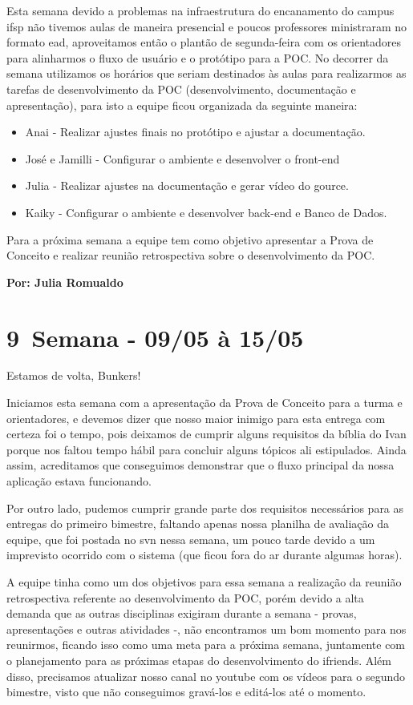 Esta semana devido a problemas na infraestrutura do encanamento do campus \acs{ifsp} não tivemos aulas de maneira presencial e poucos professores ministraram no formato \acs{ead}, aproveitamos então o plantão de segunda-feira com os orientadores para alinharmos o fluxo de usuário e o protótipo para a \acs{POC}. No decorrer da semana utilizamos os horários que seriam destinados às aulas para realizarmos as tarefas de desenvolvimento da \acs{POC} (desenvolvimento, documentação e apresentação), para isto a equipe ficou organizada da seguinte maneira: 
\begin{itemize}
    \item Anai - Realizar ajustes finais no protótipo e ajustar a documentação.
    \item José e Jamilli - Configurar o ambiente e desenvolver o \gls{front-end}
    \item Julia - Realizar ajustes na documentação e gerar vídeo do \gls{gource}.
    \item Kaiky - Configurar o ambiente e desenvolver \gls{back-end} e Banco de Dados.
\end{itemize}
\noindent Para a próxima semana a equipe tem como objetivo apresentar a Prova de Conceito e realizar reunião retrospectiva sobre o desenvolvimento da \gls{POC}.

\textbf{Por: Julia Romualdo}

\section{9\textordfeminine \, Semana - 09/05 à 15/05}
Estamos de volta, Bunkers!

Iniciamos esta semana com a apresentação da Prova de Conceito para a turma e orientadores, e devemos dizer que nosso maior inimigo para esta entrega com certeza foi o tempo, pois deixamos de cumprir alguns requisitos da bíblia do Ivan porque nos faltou tempo hábil para concluir alguns tópicos ali estipulados. Ainda assim, acreditamos que conseguimos demonstrar que o fluxo principal da nossa aplicação estava funcionando. 

Por outro lado, pudemos cumprir grande parte dos requisitos necessários para as entregas do primeiro bimestre, faltando apenas nossa planilha de avaliação da equipe, que foi postada no \gls{svn} nessa semana, um pouco tarde devido a um imprevisto ocorrido com o sistema (que ficou fora do ar durante algumas horas). 

A equipe tinha como um dos objetivos para essa semana a realização da reunião retrospectiva referente ao desenvolvimento da \gls{POC}, porém devido a alta demanda que as outras disciplinas exigiram durante a semana - provas, apresentações e outras atividades -, não encontramos um bom momento para nos reunirmos, ficando isso como uma meta para a próxima semana, juntamente com o planejamento para as próximas etapas do desenvolvimento do \gls{ifriends}. Além disso, precisamos atualizar nosso canal no \gls{youtube} com os vídeos para o segundo bimestre, visto que não conseguimos gravá-los e editá-los até o momento. 

